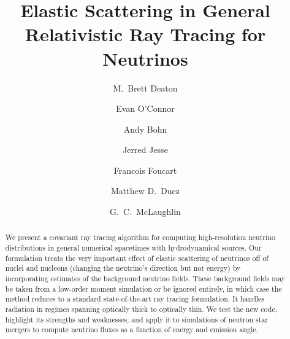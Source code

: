 \documentclass[aps,floatfix,prd,superscriptaddress,twocolumn]{revtex4-1}
\begin{document}
\widetext
{}

\title{Elastic Scattering in General Relativistic Ray Tracing for Neutrinos}

\author{M.\ Brett Deaton}

\author{Evan O'Connor}

\author{Andy Bohn}

\author{Jerred Jesse}

\author{Francois Foucart}

\author{Matthew D.\ Duez}

\author{G.\ C.\ McLaughlin}


\begin{abstract}
  We present a covariant ray tracing algorithm for computing high-resolution
  neutrino distributions in general numerical spacetimes with hydrodynamical
  sources.
  Our formulation treats the very important effect of
  elastic scattering of neutrinos off of nuclei and nucleons
  (changing the neutrino's direction but not energy)
  by incorporating estimates of the background neutrino fields.
  These background fields may be taken from a low-order moment simulation
  or be ignored entirely, in which case the method
  reduces to a standard state-of-the-art ray tracing formulation.
  It handles radiation in regimes spanning optically thick to optically thin.
  We test the new code, highlight its strengths and weaknesses, and
  apply it to simulations of neutron star mergers to
  compute neutrino fluxes as a function of energy and emission angle.
\end{abstract}
\end{document}
